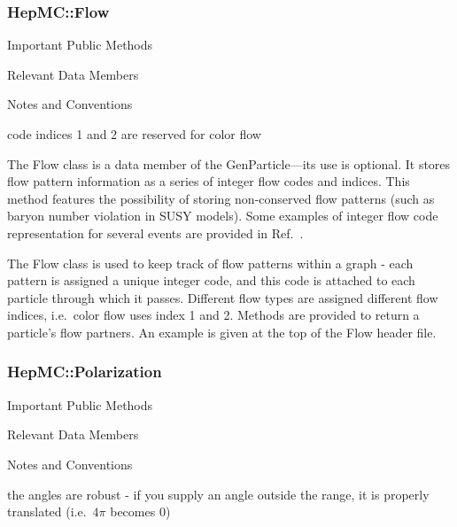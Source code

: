 \documentclass[11pt,letterpaper]{article}
\begin{document}
\subsubsection{HepMC::Flow}
\begin{myitemize}{Important Public Methods}
\end{myitemize}
\begin{myitemize}{Relevant Data Members}
\end{myitemize}
\begin{myitemize}{Notes and Conventions}
  \item code indices 1 and 2 are reserved for color flow
\end{myitemize}

The Flow class is a data member of the GenParticle---its use is
optional.  It stores flow
pattern information as a series of integer flow codes and indices.
This method features the possibility
of storing non-conserved flow patterns (such as baryon number
violation in SUSY models).
Some examples of integer flow code representation for several events
are provided in Ref.~\cite{Boos:2001cv}.

The Flow class is used to keep track of flow patterns within a graph -
each pattern is assigned a unique integer code, and this code is
attached to each particle through which it passes. Different flow
types are assigned different flow indices, i.e.\ color flow uses index
1 and 2. Methods are provided to return a particle's flow partners. An
example is given at the top of the Flow header file.

%
%

\subsubsection{HepMC::Polarization}
\begin{myitemize}{Important Public Methods}
\end{myitemize}
\begin{myitemize}{Relevant Data Members}
\end{myitemize}
\begin{myitemize}{Notes and Conventions}
  \item the angles are robust - if you supply an angle outside the
    range, it is properly translated (i.e.\ $4\pi$ becomes 0)
\end{myitemize}
\end{document}
